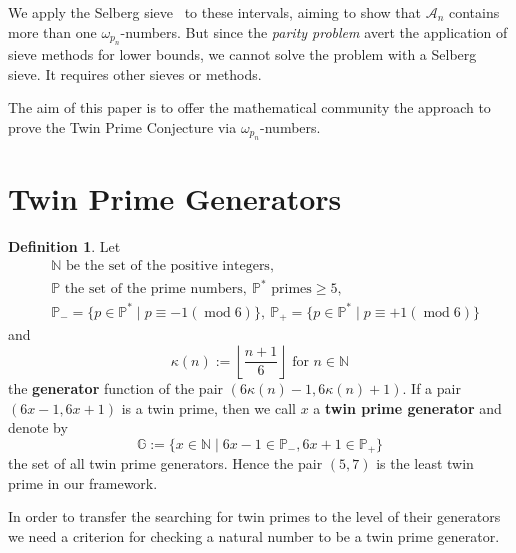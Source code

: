 \documentclass[fmeq,reqno]{amsart}
\theoremstyle{definition}
\newtheorem{definition}[theorem]{Definition}
\theoremstyle{remark}
\numberwithin{equation}{section}
\newcommand{\N}{\mathbb{N}}
\newcommand{\G}{\mathbb{G}}
\newcommand{\p}{\mathbb{P}}
\newcommand{\mc}[1]{\mathcal{#1}}
\newcommand{\mood}[1]{(\operatorname{mod} #1)}
\newcommand{\om}[1]{$\omega_{#1}$}
\begin{document}
We apply the Selberg sieve~\cite{selberg} to these intervals, aiming to show that $\mc{A}_n$ contains 
more than one \om{p_n}-numbers. But since the \emph{parity problem} avert the application of sieve methods for lower bounds, we cannot solve the problem with a Selberg sieve. It requires other sieves or methods.

The aim of this paper is to offer the mathematical community the approach to prove the Twin Prime Conjecture via \om{p_n}-numbers.
\bigskip

\section{Twin Prime Generators}

\begin{definition}\label{D-twinprimegenerators}
Let
\begin{align*}
&\N \mbox{ be the set of the positive integers},\\
&\p \mbox{ the set of the prime numbers}, ~ \p^* \mbox{ primes}  \geq 5, \\
&\p_{-}  = \lbrace p \in \p^* \mid p \equiv -1  \mood{6} \rbrace,  
~ \p_{+}  = \lbrace p \in \p^* \mid p \equiv +1  \mood{6} \rbrace  \end{align*}
and
\[
\kappa(n):=
\left\lfloor\frac{n+1}{6}\right\rfloor\mbox{ for } n\in\N
\]
the \textbf{generator} function of the pair $(6\kappa(n)-1,6\kappa(n)+1)$. 
If a pair $(6x-1,6x+1)$ is a twin prime, then we call $x$ a \textbf{twin prime generator} and denote by
\[
\G:=\lbrace x\in\N\mid 6x-1\in\p_-, 6x+1\in\p_+\rbrace
\]
the set of all twin prime generators. Hence the pair $(5,7)$ is the least twin prime in our framework.
\end{definition}

In order to transfer the searching for twin primes to the level of their generators we need a criterion for checking a natural number to be a twin prime generator. 
\end{document}
